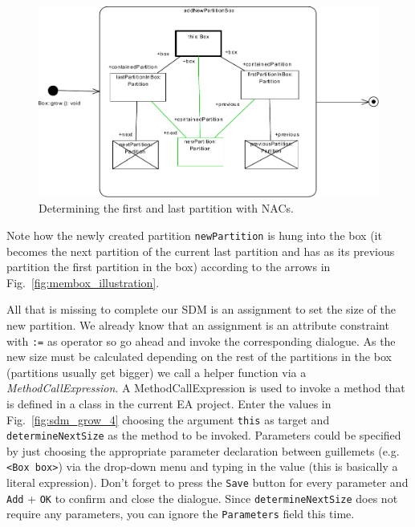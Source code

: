\begin{figure}[htbp]
\begin{center}
  \includegraphics[width=\textwidth]{pics/sdmBilder/grow/sdm65} 
  \caption{Determining the first and last partition with NACs.}  
  \label{fig:sdm_grow_3}
\end{center}
\end{figure}
 
Note how the newly created partition
\texttt{newPartition} is hung into the box (it becomes the next partition of the
current last partition and has as its previous partition the first partition
in the box) according to the arrows in Fig.~\ref{fig:membox_illustration}.
  
All that is missing to complete our SDM is an assignment to set the size of the
new partition.  We already know that an assignment is an attribute
constraint with \texttt{:=} as operator so go ahead and invoke the corresponding
dialogue.  As the new size must be calculated depending on the rest of the
partitions in the box (partitions usually get bigger) we call a helper function
via a \emph{MethodCallExpression}.  A MethodCallExpression is used to invoke a
method that is defined in a class in the current EA project.  Enter the values
in Fig.~\ref{fig:sdm_grow_4} choosing the argument \texttt{this} as target and
\texttt{determineNextSize} as the method to be invoked.  Parameters could be
specified by just choosing the appropriate parameter declaration between
guillemets (e.g. \texttt{<Box box>}) via the drop-down menu and typing in the
value (this is basically a literal expression). Don't forget to
press the \texttt{Save} button for every parameter and \texttt{Add} 
+ \texttt{OK} to confirm and close the dialogue. Since \texttt{determineNextSize} does not require any parameters, you can ignore the \texttt{Parameters} field this time.
 
